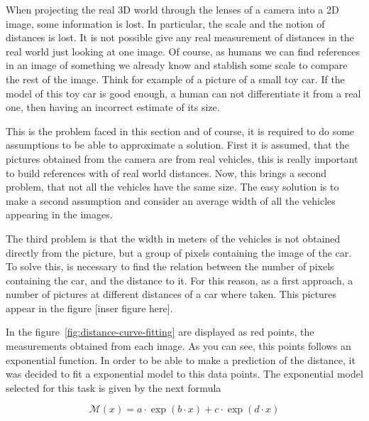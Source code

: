 When projecting the real 3D world through the lenses of a camera into a 2D
image, some information is lost. In particular, the scale and the notion of
distances is lost. It is not possible give any real
measurement of distances in the real world just looking at one image. 
Of course, as humans we can find references in an image of something we already
know and stablish some scale to compare the rest of the image. Think for
example of a picture of a small toy car. If the model of this toy car is good 
enough, a human can not differentiate it from a real one, then having an
incorrect estimate of its size.

This is the problem faced in this section and of course, it is required to do some
assumptions to be able to approximate a solution. First it is assumed, that the
pictures obtained from the camera are from real vehicles, this is really
important to build references with of real world distances. Now, this brings a
second problem, that not all the vehicles have the same size. 
The easy solution is to make a second assumption and consider an average width
of all the vehicles appearing in the images.

The third problem is that the width in meters of the vehicles is not obtained 
directly from the picture, but a group of pixels containing the image of
the car. To solve this, is necessary to find the relation between the number of
pixels containing the car, and the distance to it. For this reason, as a first
approach, a number of pictures at different distances of a car where taken. This
pictures appear in the figure [inser figure here].

In the figure~\ref{fig:distance-curve-fitting} are displayed as red points, the
measurements obtained from each image. As you can see, this points follows an
exponential function. In order to be able to make a prediction of the distance,
it was decided to fit a exponential model to this data points. The exponential
model selected for this task is given by the next formula

\begin{equation}
    \mathcal{M}(x) = a \cdot \exp(b \cdot x) + c \cdot \exp(d \cdot x)
    \label{eq:distance-curve-model}
\end{equation}

